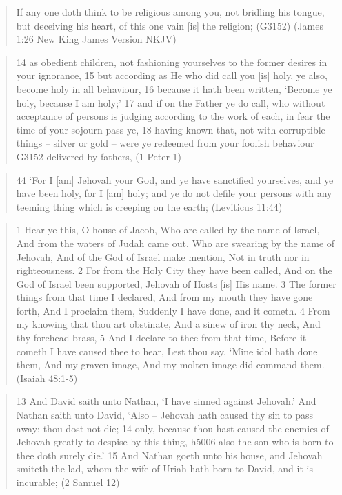\documentclass[11pt]{article}
\begin{document}
\begin{quote}
If any one doth think to be religious among you, not bridling his tongue, but deceiving his heart, of this one vain [is] the religion; (G3152)
(James 1:26 New King James Version NKJV)
\end{quote}
\begin{quote}
14 as obedient children, not fashioning yourselves to the former desires in your ignorance,
15 but according as He who did call you [is] holy, ye also, become holy in all behaviour,
16 because it hath been written, `Become ye holy, because I am holy;'
17 and if on the Father ye do call, who without acceptance of persons is judging according to the work of each, in fear the time of your sojourn pass ye,
18 having known that, not with corruptible things -- silver or gold -- were ye redeemed from your foolish behaviour G3152 delivered by fathers,
(1 Peter 1)
\end{quote}
\begin{quote}
44 `For I [am] Jehovah your God, and ye have sanctified yourselves, and ye have been holy, for I [am] holy; and ye do not defile your persons with any teeming thing which is creeping on the earth;
(Leviticus 11:44)
\end{quote}
\begin{quote}
1 Hear ye this, O house of Jacob, Who are called by the name of Israel, And from the waters of Judah came out, Who are swearing by the name of Jehovah, And of the God of Israel make mention, Not in truth nor in righteousness.
2 For from the Holy City they have been called, And on the God of Israel been supported, Jehovah of Hosts [is] His name.
3 The former things from that time I declared, And from my mouth they have gone forth, And I proclaim them, Suddenly I have done, and it cometh.
4 From my knowing that thou art obstinate, And a sinew of iron thy neck, And thy forehead brass,
5 And I declare to thee from that time, Before it cometh I have caused thee to hear, Lest thou say, `Mine idol hath done them, And my graven image, And my molten image did command them.
(Isaiah 48:1-5)
\end{quote}
\begin{quote}
13 And David saith unto Nathan, `I have sinned against Jehovah.' And Nathan saith unto David, `Also -- Jehovah hath caused thy sin to pass away; thou dost not die;
14 only, because thou hast caused the enemies of Jehovah greatly to despise by this thing, h5006 also the son who is born to thee doth surely die.'
15 And Nathan goeth unto his house, and Jehovah smiteth the lad, whom the wife of Uriah hath born to David, and it is incurable;
(2 Samuel 12)
\end{quote}
\end{document}
